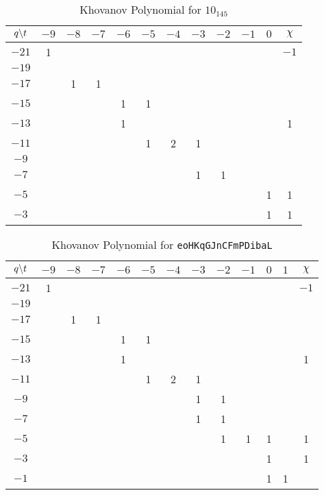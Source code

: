 \begin{table}
    \centering
    \begin{tabular}{| c | c | c | c | c | c | c | c | c | c | c | c |}
        \hline
        $q\symbol{92}t$&$-9$&$-8$&$-7$&$-6$&$-5$&$-4$&$-3$&$-2$&$-1$&$0$&$\chi$\\
        \hline
        $-21$&1&&&&&&&&&&$-1$\\
        \hline
        $-19$&&&&&&&&&&&\\
        \hline
        $-17$&&1&1&&&&&&&&\\
        \hline
        $-15$&&&&1&1&&&&&&\\
        \hline
        $-13$&&&&1&&&&&&&1\\
        \hline
        $-11$&&&&&1&2&1&&&&\\
        \hline
        $-9$&&&&&&&&&&&\\
        \hline
        $-7$&&&&&&&1&1&&&\\
        \hline
        $-5$&&&&&&&&&&1&1\\
        \hline
        $-3$&&&&&&&&&&1&1\\
        \hline
    \end{tabular}
    \caption{Khovanov Polynomial for $10_{145}$}
\end{table}
\begin{table}
    \centering
    \begin{tabular}{| c | c | c | c | c | c | c | c | c | c | c | c | c |}
        \hline
        $q\symbol{92}t$&$-9$&$-8$&$-7$&$-6$&$-5$&$-4$&$-3$&$-2$&$-1$&$0$&$1$&$\chi$\\
        \hline
        $-21$&1&&&&&&&&&&&$-1$\\
        \hline
        $-19$&&&&&&&&&&&&\\
        \hline
        $-17$&&1&1&&&&&&&&&\\
        \hline
        $-15$&&&&1&1&&&&&&&\\
        \hline
        $-13$&&&&1&&&&&&&&1\\
        \hline
        $-11$&&&&&1&2&1&&&&&\\
        \hline
        $-9$&&&&&&&1&1&&&&\\
        \hline
        $-7$&&&&&&&1&1&&&&\\
        \hline
        $-5$&&&&&&&&1&1&1&&1\\
        \hline
        $-3$&&&&&&&&&&1&&1\\
        \hline
        $-1$&&&&&&&&&&1&1&\\
        \hline
    \end{tabular}
    \caption{Khovanov Polynomial for \texttt{eoHKqGJnCFmPDibaL}}
\end{table}
